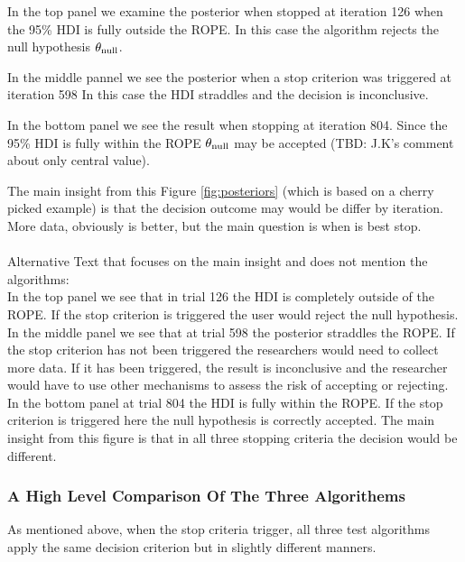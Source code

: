 In the top panel we examine the posterior
when stopped at iteration 126 when the 95\% HDI is fully outside the ROPE.
In this case the algorithm %
rejects the null hypothesis $\theta_{\rm null}$.

In the middle pannel we see the posterior
when a stop criterion was triggered at iteration 598
In this case the HDI straddles and the decision is inconclusive.

In the bottom panel we see the result
when stopping at iteration 804.
Since the 95\% HDI is fully within the ROPE
$\theta_{\rm null}$ may be accepted (TBD: J.K's comment about only central value).

The main insight from this Figure \ref{fig:posteriors} (which is based on a 
cherry picked example) is that the decision outcome may would be differ by iteration.
More data, obviously is better, but the main question is when is best stop.
\\
\\
Alternative Text that focuses on the main insight and does not mention the algorithms:\\


In the top panel we see that in trial 126 the HDI is completely outside of the ROPE.
If the stop criterion is triggered the user would reject the null hypothesis.
In the middle panel we see that at trial 598 the posterior straddles the ROPE.
If the stop criterion has not been triggered the researchers would need to collect more
data. If it has been triggered, the result is inconclusive and the researcher would have
to use other mechanisms to assess the risk of accepting or rejecting. In the bottom
panel at trial 804 the HDI is fully within the ROPE. If the stop criterion is triggered
here the null hypothesis is correctly accepted. The main insight from this figure is
that in all three stopping criteria the decision would be different.

\subsubsection{A High Level Comparison Of The Three Algorithems}

As mentioned above, when the stop criteria trigger, all three test algorithms
apply the same decision criterion but in slightly different manners.


